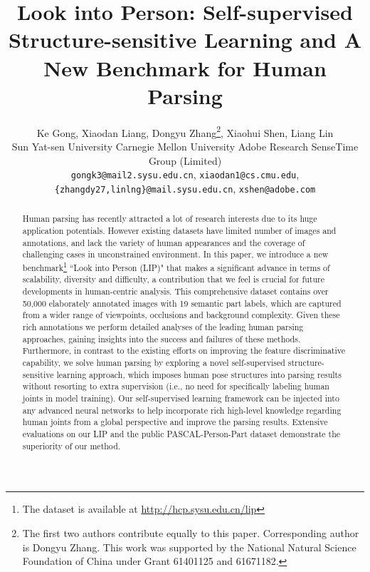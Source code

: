 \documentclass[10pt,twocolumn,letterpaper]{article}
\begin{document}
\title{Look into Person: Self-supervised Structure-sensitive Learning and A New Benchmark for Human Parsing}

\author{Ke Gong, \quad Xiaodan Liang, \quad Dongyu Zhang\thanks{The first two authors contribute equally to this paper. Corresponding author is Dongyu Zhang.   This work was supported by the National Natural Science Foundation of China under Grant 61401125 and 61671182.}, \quad Xiaohui Shen, \quad Liang Lin\\
Sun Yat-sen University \quad Carnegie Mellon University \quad Adobe Research \quad SenseTime Group (Limited) \\
	{\tt\footnotesize gongk3@mail2.sysu.edu.cn}, {\tt\small xiaodan1@cs.cmu.edu}, {\tt\small \{zhangdy27,linlng\}@mail.sysu.edu.cn}, {\tt\small xshen@adobe.com}
}

\maketitle


\begin{abstract}
Human parsing has recently attracted a lot of research interests due to its huge application potentials. However existing datasets have limited number of images and annotations, and lack the variety of human appearances and the coverage of challenging cases in unconstrained environment. In this paper, we introduce a new benchmark\footnote {The dataset is available at \url{http://hcp.sysu.edu.cn/lip}} ``Look into Person (LIP)" that makes a significant advance in terms of scalability, diversity and difficulty, a contribution that we feel is crucial for future developments in human-centric analysis. This comprehensive dataset contains over 50,000 elaborately  annotated images with 19 semantic part labels, which are captured from a wider range of viewpoints, occlusions and background complexity. Given these rich annotations we perform detailed analyses of the leading human parsing approaches, gaining insights into the success and failures of these methods. Furthermore, in contrast to the existing efforts on improving the feature discriminative capability, we solve human parsing by exploring a novel self-supervised structure-sensitive learning approach, which imposes human pose structures into parsing results without resorting to extra supervision (i.e., no need for specifically labeling human joints in model training). Our self-supervised learning framework can be injected into any advanced neural networks to help incorporate rich high-level knowledge regarding human joints from a global perspective  and improve the parsing results. Extensive evaluations on our LIP and the public PASCAL-Person-Part dataset demonstrate the superiority of our method.
\end{abstract}
\end{document}
